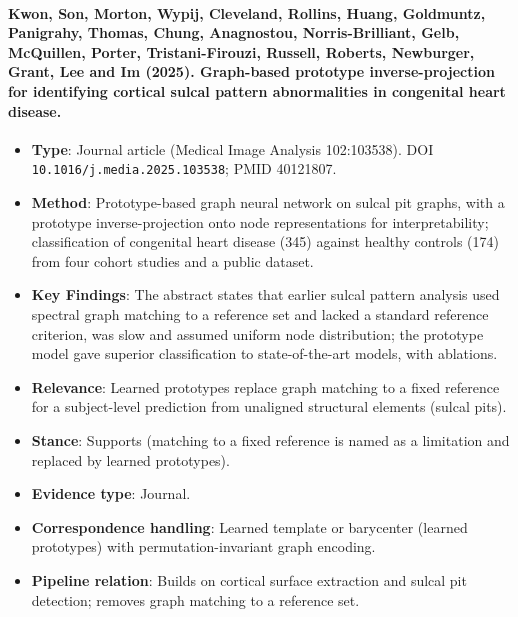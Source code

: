 \documentclass[journal,onecolumn]{IEEEtran}
\begin{document}
\paragraph{Kwon, Son, Morton, Wypij, Cleveland, Rollins, Huang, Goldmuntz, Panigrahy, Thomas, Chung, Anagnostou, Norris-Brilliant, Gelb, McQuillen, Porter, Tristani-Firouzi, Russell, Roberts, Newburger, Grant, Lee and Im (2025). Graph-based prototype inverse-projection for identifying cortical sulcal pattern abnormalities in congenital heart disease.~\cite{Kwon2025Graph}}\mbox{}

\begin{itemize}

\item{} \textbf{Type}: Journal article (Medical Image Analysis 102:103538). DOI \nolinkurl{10.1016/j.media.2025.103538}; PMID 40121807.

\item{} \textbf{Method}: Prototype-based graph neural network on sulcal pit graphs, with a prototype inverse-projection onto node representations for interpretability; classification of congenital heart disease (345) against healthy controls (174) from four cohort studies and a public dataset.

\item{} \textbf{Key Findings}: The abstract states that earlier sulcal pattern analysis used spectral graph matching to a reference set and lacked a standard reference criterion, was slow and assumed uniform node distribution; the prototype model gave superior classification to state-of-the-art models, with ablations.

\item{} \textbf{Relevance}: Learned prototypes replace graph matching to a fixed reference for a subject-level prediction from unaligned structural elements (sulcal pits).

\item{} \textbf{Stance}: Supports (matching to a fixed reference is named as a limitation and replaced by learned prototypes).

\item{} \textbf{Evidence type}: Journal.

\item{} \textbf{Correspondence handling}: Learned template or barycenter (learned prototypes) with permutation-invariant graph encoding.

\item{} \textbf{Pipeline relation}: Builds on cortical surface extraction and sulcal pit detection; removes graph matching to a reference set.


\end{itemize}
\end{document}
